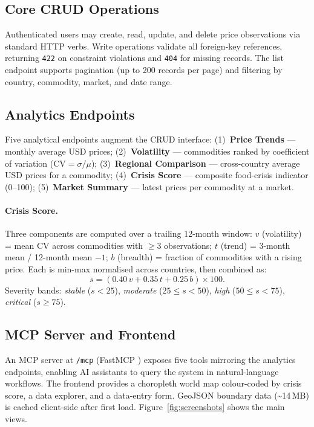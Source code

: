 \subsection{Core CRUD Operations}

Authenticated users may create, read, update, and delete price observations via
standard HTTP verbs.
Write operations validate all foreign-key references, returning \texttt{422} on
constraint violations and \texttt{404} for missing records.
The list endpoint supports pagination (up to 200 records per page) and filtering
by country, commodity, market, and date range.

\subsection{Analytics Endpoints}

Five analytical endpoints augment the CRUD interface:
(1)~\textbf{Price Trends} — monthly average USD prices;
(2)~\textbf{Volatility} — commodities ranked by coefficient of variation
    ($\mathrm{CV} = \sigma/\mu$);
(3)~\textbf{Regional Comparison} — cross-country average USD prices for a commodity;
(4)~\textbf{Crisis Score} — composite food-crisis indicator (0--100);
(5)~\textbf{Market Summary} — latest prices per commodity at a market.

\paragraph{Crisis Score.}
Three components are computed over a trailing 12-month window:
$v$ (volatility) = mean CV across commodities with $\geq3$ observations;
$t$ (trend) = 3-month mean / 12-month mean $-1$;
$b$ (breadth) = fraction of commodities with a rising price.
Each is min-max normalised across countries, then combined as:
\begin{equation}
    s = (0.40\,v + 0.35\,t + 0.25\,b)\times 100.
    \label{eq:crisis}
\end{equation}
Severity bands: \textit{stable} ($s<25$), \textit{moderate} ($25\leq s<50$),
\textit{high} ($50\leq s<75$), \textit{critical} ($s\geq 75$).

\subsection{MCP Server and Frontend}

An MCP server at \texttt{/mcp} (FastMCP \parencite{fastmcp_docs}) exposes five
tools mirroring the analytics endpoints, enabling AI assistants to query the
system in natural-language workflows.
The frontend provides a choropleth world map colour-coded by crisis score, a
data explorer, and a data-entry form.
GeoJSON boundary data (\textasciitilde14\,MB) is cached client-side after first load.
Figure~\ref{fig:screenshots} shows the main views.

